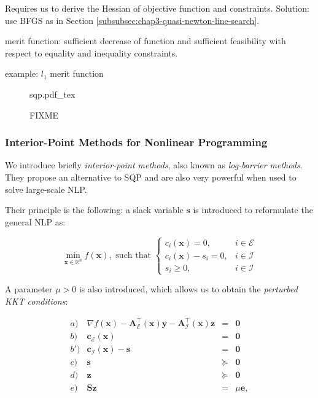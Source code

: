 Requires us to derive the Hessian of objective function and
constraints. Solution: use BFGS as in Section
\ref{subsubsec:chap3-quasi-newton-line-search}.

merit function: sufficient decrease of function and sufficient
feasibility with respect to equality and inequality constraints.

example: $l_1$ merit function

\begin{figure}
  \centering
      {\def\svgwidth{0.5\linewidth}
        {\footnotesize
          
                     {sqp.pdf_tex}
        }
      }
      \caption{FIXME}
      \label{fig:chap3-sqp}
\end{figure}

\subsubsection{Interior-Point Methods for Nonlinear Programming}

We introduce briefly \emph{interior-point methods}, also known as
\emph{log-barrier methods}. They propose an alternative to SQP and are
also very powerful when used to solve large-scale NLP.

Their principle is the following: a slack variable $\mathbf{s}$ is
introduced to reformulate the general NLP as:

\begin{equation}
\label{eq:chap3-nlp-slack}
\min_{\mathbf{x} \in \mathbb R^n}
f(\mathbf{x}),\text{ such that }
\left\{\begin{array}{cc}
c_i(\mathbf{x}) = 0, & i \in \mathcal{E} \\%
c_i(\mathbf{x})-s_i = 0, & i \in \mathcal{I} \\%
s_i \ge 0, & i \in \mathcal{I} %
\end{array}\right.
\end{equation}

A parameter $\mu>0$ is also introduced, which allows us to obtain the
\emph{perturbed KKT conditions}:

\begin{equation}
\label{eq:chap3-kkt-perturbed}
\begin{array}{crcl}
a) & \nabla f(\mathbf{x}) - \mathbf{A}_\mathcal{E}^{\top}(\mathbf{x})\mathbf{y} - \mathbf{A}_\mathcal{I}^{\top}(\mathbf{x})\mathbf{z} & = & \mathbf{0} \\%
b) & \mathbf{c}_{\mathcal{E}}(\mathbf{x}) & = & \mathbf{0} \\%
b')& \mathbf{c}_{\mathcal{I}}(\mathbf{x}) - \mathbf{s}& = & \mathbf{0} \\%
c) & \mathbf{s} & \succeq & \mathbf{0} \\%
d) & \mathbf{z} & \succeq & \mathbf{0} \\%
e) & \mathbf{S}\mathbf{z} & = & \mu\mathbf{e}, \\%
\end{array}
\end{equation}

